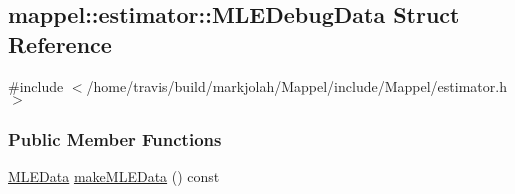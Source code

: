 \hypertarget{structmappel_1_1estimator_1_1MLEDebugData}{}\subsection{mappel\+:\+:estimator\+:\+:M\+L\+E\+Debug\+Data Struct Reference}
\label{structmappel_1_1estimator_1_1MLEDebugData}


{\ttfamily \#include $<$/home/travis/build/markjolah/\+Mappel/include/\+Mappel/estimator.\+h$>$}

\subsubsection*{Public Member Functions}
\begin{DoxyCompactItemize}
\item 
\hyperlink{namespacemappel_1_1estimator_structmappel_1_1estimator_1_1MLEData}{M\+L\+E\+Data} \hyperlink{structmappel_1_1estimator_1_1MLEDebugData_a785288e45bd2d04af927552c01c70159}{make\+M\+L\+E\+Data} () const 
\end{DoxyCompactItemize}
